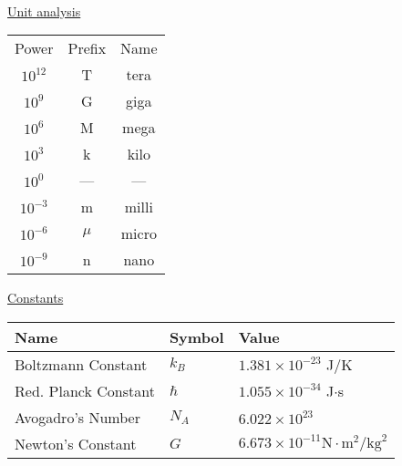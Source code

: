 \thispagestyle{empty}
\newcommand{\degrees}{$^\circ$}
\setlength{\parindent}{12pt}

\begin{center}
\\
\end{center}
\begin{multicols}{2}
\begin{minipage}{\columnwidth}
\centering\underline{Unit analysis}\\
\begin{tabular}{c c c}
Power & Prefix & Name\\
$10^{12}$ & T & tera\\
$10^9$ & G & giga\\
$10^6$ & M & mega\\
$10^3$ & k & kilo\\
$10^0$ & --- & ---\\
$10^{-3}$ & m & milli\\
$10^{-6}$ & $\mu$ & micro\\
$10^{-9}$ & n & nano
\end{tabular}
\end{minipage}

\vspace{7cm}
\begin{minipage}{\columnwidth}
\begin{center}\underline{Constants}\end{center}
\begin{tabular}{lll}
	Name&Symbol&Value\\ \hline
	Boltzmann Constant & $k_B$ & $1.381\times10^{-23}$ J/K\\
	Red. Planck Constant & $\hbar$ & $1.055\times10^{-34}$ J$\cdot$s\\
	Avogadro's Number &$N_A$& $6.022\times10^{23}$\\
	Newton's Constant &$G$ & $6.673\times10^{-11}\mathrm{N}\cdot\mathrm{m}^2/\mathrm{kg}^2$\\
\end{tabular}
\end{minipage}


\begin{minipage}{\columnwidth}
	

\end{minipage}
\end{multicols}
